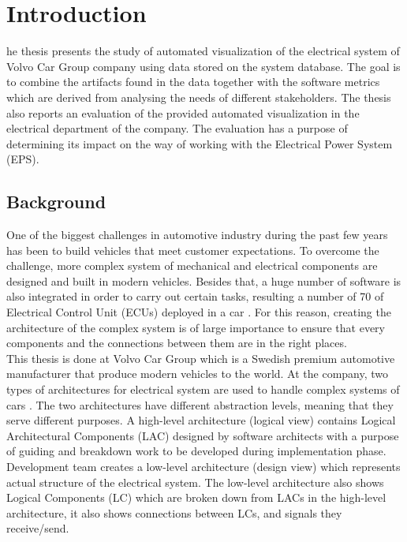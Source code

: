 \chapter{Introduction}
\lettrine[findent=2pt]{}{ }he thesis presents the study of automated visualization of the electrical system of Volvo Car Group company using data stored on the system database. The goal is to combine the artifacts found in the data together with the software metrics which are derived from analysing the needs of different stakeholders. The thesis also reports an evaluation of the provided automated visualization in the electrical department of the company. The evaluation has a purpose of determining its impact on the way of working with the Electrical Power System (EPS). 

\section{Background}\label{Background_ref}
One of the biggest challenges in automotive industry during the past few years has been to build vehicles that meet customer expectations. To overcome the challenge, more complex system of mechanical and electrical components are designed and built in modern vehicles. Besides that, a huge number of software is also integrated in order to carry out certain tasks, resulting a number of 70 of Electrical Control Unit (ECUs) deployed in a car \cite{Beeck}. For this reason, creating the architecture of the complex system is of large importance to ensure that every components and the connections between them are in the right places. \\

This thesis is done at Volvo Car Group which is a Swedish premium automotive manufacturer that produce modern vehicles to the world. At the company, two types of architectures for electrical system are used to handle complex systems of cars \cite{Eliasson_1}. The two architectures have different abstraction levels, meaning that they serve different purposes. A high-level architecture (logical view) contains Logical Architectural Components (LAC) designed by software architects with a purpose of guiding and breakdown work to be developed during implementation phase. Development team creates a low-level architecture (design view) which represents actual structure of the electrical system. The low-level architecture also shows Logical Components (LC) which are broken down from LACs in the high-level architecture, it also shows connections between LCs, and signals they receive/send. \\


